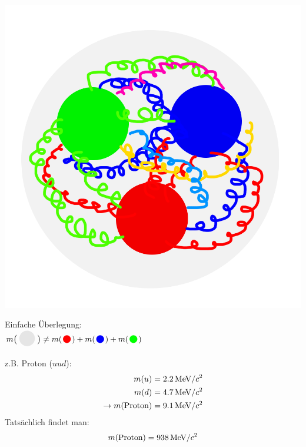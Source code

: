 \begin{frame}\addtocounter{framenumber}{-1}
\begin{minipage} {0.3\textwidth}
\includegraphics[width=\textwidth]{Figures Introductory Lecture/Standard Model/Hadron_seequarks_coloured.png}
\end{minipage}
\begin{minipage} {0.65\textwidth}
Einfache Überlegung:\\  $m\big( \textcolor{lightgray}{ \BigbulletG}\big)\neq m(\textcolor{red}{\Bigbullet})+m(\textcolor{blue}{\Bigbullet})+m(\textcolor{green}{\Bigbullet})$
\end{minipage}
z.B. Proton ($uud$):\\
\begin{align*} 
m(u)&=2.2  \,\textmd{MeV}/c^2\\m(d)&= 4.7 \, \textmd{MeV}/c^2 \\ \rightarrow m(\textmd{Proton})&=9.1  \,\textmd{MeV}/c^2
\end{align*} 
Tatsächlich findet man:
\begin{align*} 
m(\textmd{Proton})=938  \,\textmd{MeV}/c^2
\end{align*} 
\end{frame}
